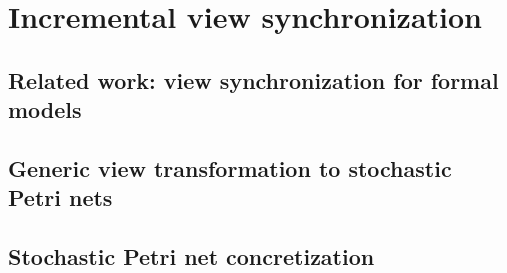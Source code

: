 \chapter{Incremental view synchronization}
\label{chap:transform}


\section{Related work: view synchronization for formal models}
\label{chap:transform:relwork}

\section{Generic view transformation to stochastic Petri nets}
\label{chap:transform:view}

\section{Stochastic Petri net concretization}
\label{chap:transform:concretizer}